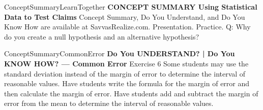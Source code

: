 \documentclass{article}
\newenvironment{te-addendum}[2]{}{}     %
\newcommand{\answer}[1]{}               %
\begin{document}
\begin{te-addendum}{ConceptSummary}{LearnTogether}
\textbf{CONCEPT SUMMARY Using Statistical Data to Test Claims}
Concept Summary, Do You Understand, and Do You Know How are available at SavvasRealize.com. Presentation. Practice.
Q: Why do you create a null hypothesis and an alternative hypothesis?
\answer{You create a null hypothesis to state information mathematically about the parameter you are testing. You create an alternative hypothesis to state what happens if the null hypothesis is not true.}
\end{te-addendum}
\begin{te-addendum}{ConceptSummary}{CommonError}
\textbf{Do You UNDERSTAND? | Do You KNOW HOW? — Common Error}
Exercise 6 Some students may use the standard deviation instead of the margin of error to determine the interval of reasonable values. Have students write the formula for the margin of error and then calculate the margin of error. Have students add and subtract the margin of error from the mean to determine the interval of reasonable values.
\end{te-addendum}
\end{document}
